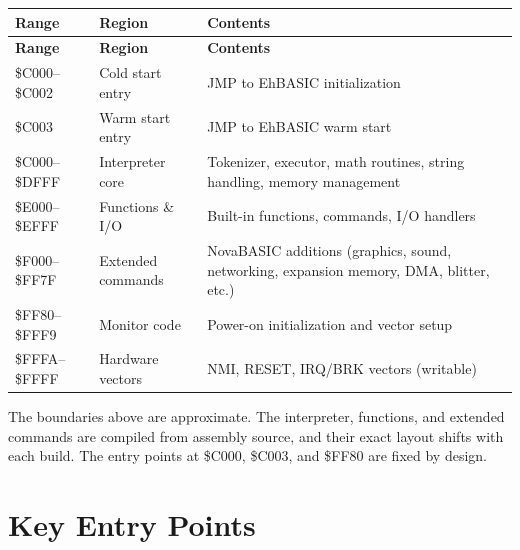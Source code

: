 \begin{center}
\small
\begin{longtable}{@{}llp{8cm}@{}}
\toprule
\textbf{Range} & \textbf{Region} & \textbf{Contents} \\
\midrule
\endfirsthead
\toprule
\textbf{Range} & \textbf{Region} & \textbf{Contents} \\
\midrule
\endhead
\$C000--\$C002 & Cold start entry   & JMP to EhBASIC initialization \\
\$C003         & Warm start entry   & JMP to EhBASIC warm start \\
\$C000--\$DFFF & Interpreter core   & Tokenizer, executor, math routines,
                                       string handling, memory management \\
\$E000--\$EFFF & Functions \& I/O   & Built-in functions, commands, I/O
                                       handlers \\
\$F000--\$FF7F & Extended commands  & NovaBASIC additions (graphics, sound,
                                       networking, expansion memory, DMA,
                                       blitter, etc.) \\
\$FF80--\$FFF9 & Monitor code       & Power-on initialization and vector
                                       setup \\
\$FFFA--\$FFFF & Hardware vectors   & NMI, RESET, IRQ/BRK vectors
                                       (writable) \\
\bottomrule
\end{longtable}
\end{center}

\begin{notebox}
The boundaries above are approximate.  The interpreter, functions, and
extended commands are compiled from assembly source, and their exact
layout shifts with each build.  The entry points at \$C000, \$C003, and
\$FF80 are fixed by design.
\end{notebox}


\section{Key Entry Points}
\label{sec:rom-entry}


